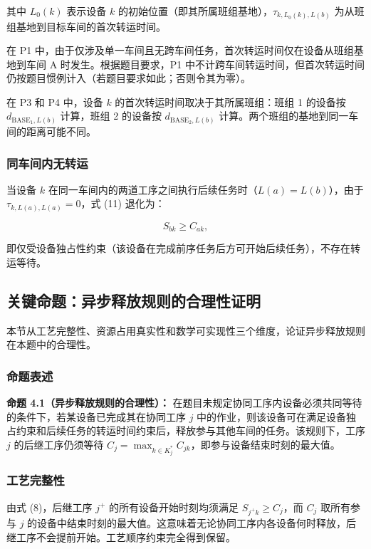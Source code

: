 \documentclass[UTF8,a4paper,12pt]{ctexart}
\begin{document}
其中 $L_0(k)$ 表示设备 $k$ 的初始位置（即其所属班组基地），$\tau_{k, L_0(k), L(b)}$ 为从班组基地到目标车间的首次转运时间。

在 P1 中，由于仅涉及单一车间且无跨车间任务，首次转运时间仅在设备从班组基地到车间 A 时发生。根据题目要求，P1 中不计跨车间转运时间，但首次转运时间仍按题目惯例计入（若题目要求如此；否则令其为零）。

在 P3 和 P4 中，设备 $k$ 的首次转运时间取决于其所属班组：班组 1 的设备按 $d_{\text{BASE}_1, L(b)}$ 计算，班组 2 的设备按 $d_{\text{BASE}_2, L(b)}$ 计算。两个班组的基地到同一车间的距离可能不同。

\subsubsection{同车间内无转运}
当设备 $k$ 在同一车间内的两道工序之间执行后续任务时（$L(a) = L(b)$），由于 $\tau_{k, L(a), L(a)} = 0$，式 (11) 退化为：

\begin{equation}
S_{bk} \geq C_{ak},
\end{equation}

即仅受设备独占性约束（该设备在完成前序任务后方可开始后续任务），不存在转运等待。

\subsection{关键命题：异步释放规则的合理性证明}
本节从工艺完整性、资源占用真实性和数学可实现性三个维度，论证异步释放规则在本题中的合理性。

\subsubsection{命题表述}
\textbf{命题 4.1（异步释放规则的合理性）：} 在题目未规定协同工序内设备必须共同等待的条件下，若某设备已完成其在协同工序 $j$ 中的作业，则该设备可在满足设备独占约束和后续任务的转运时间约束后，释放参与其他车间的任务。该规则下，工序 $j$ 的后继工序仍须等待 $C_j = \max_{k \in K_j^*} C_{jk}$，即参与设备结束时刻的最大值。

\subsubsection{工艺完整性}
由式 (8)，后继工序 $j^+$ 的所有设备开始时刻均须满足 $S_{j^+k} \geq C_j$，而 $C_j$ 取所有参与 $j$ 的设备中结束时刻的最大值。这意味着无论协同工序内各设备何时释放，后继工序不会提前开始。工艺顺序约束完全得到保留。
\end{document}
